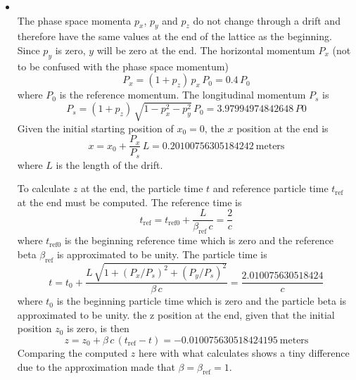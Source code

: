 \documentclass{hitec}     %
\begin{document}
{{{{\begin{itemize}[leftmargin=*]
%
\item[]\hspace*{-24pt} \\
The phase space momenta $p_x$, $p_y$ and $p_z$ do not change through a drift and therefore have the same values at the 
end of the lattice as the beginning. Since $p_y$ is zero, $y$ will be zero at the end. The horizontal momentum $P_x$ (not to be confused with the phase space momentum)
\begin{equation}
    P_x = (1 + p_z) \, p_x \, P_0 = 0.4 \, P_0
\end{equation}
where $P_0$ is the reference momentum. The longitudinal momentum $P_s$ is
\begin{equation}
    P_s = (1 + p_z) \, \sqrt{1 - p_x^2 - p_y^2} \, P_0 = 3.97994974842648 \, P0
\end{equation}
Given the initial starting position of $x_0 = 0$,  the $x$ position at the end is
\begin{equation}
    x = x_0 + \frac{P_x}{P_s} \, L = 0.20100756305184242~\text{meters}
\end{equation}
where $L$ is the length of the drift.

To calculate $z$ at the end, the particle time $t$ and reference particle time $t_\text{ref}$ at the end must be computed.
The reference time is
\begin{equation}
  t_\text{ref} = t_\text{ref0} + \frac{L}{\beta_\text{ref} \, c} = \frac{2}{c}
\end{equation}
where $t_\text{ref0}$ is the beginning reference time which is zero and
the reference beta $\beta_\text{ref}$ is approximated to be unity.
The particle time is
\begin{equation}
    t = t_0 + \frac{L \, \sqrt{1 + (P_x/P_s)^2 + (P_y/P_s)^2}}{\beta \, c} = \frac{2.010075630518424}{c}
\end{equation}
where $t_0$ is the beginning particle time which is zero and the particle beta is approximated to be unity.
the z position at the end, given that the initial position $z_0$ is zero, is then
\begin{equation}
    z = z_0 + \beta \, c \, (t_\text{ref} - t) = -0.010075630518424195~\text{meters}
\end{equation}
Comparing the computed $z$ here with what \bmad calculates shows a tiny difference due to the approximation made that
$\beta = \beta_\text{ref} = 1$.
\end{itemize}

}}}}
\end{document}
